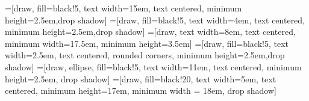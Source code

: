 
\newcommand{\mx}[1]{\mathbf{\bm{#1}}} %
\newcommand{\vc}[1]{\mathbf{\bm{#1}}} %



=[draw, fill=black!5, text width=15em,
text centered, minimum height=2.5em,drop shadow]
=[draw, fill=black!5, text width=4em,
text centered, minimum height=2.5em,drop shadow]
=[draw, text width=8em,
text centered, minimum width=17.5em, minimum height=3.5em]
=[draw, fill=black!5, text width=2.5em,
text centered, rounded corners, minimum height=2.5em,drop shadow]
=[draw, ellipse, fill=black!5, text width=11em,
text centered, minimum height=2.5em, drop shadow]
=[draw, fill=black!20, text width=5em,
text centered, minimum height=17em, minimum width = 18em, drop shadow]

\def\blockdist{1.5}
\def\edgedist{2.5}

